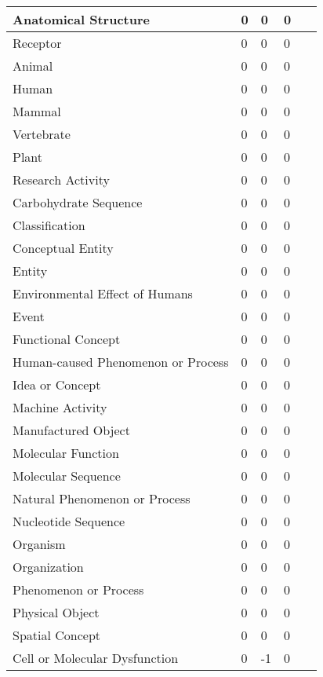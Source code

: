 \documentclass[10.7pt,]{article}
\begin{document}
\begin{longtable}{|l|p{0.3cm}|p{0.3cm}|p{0.3cm}|p{7.9cm}|}
        Anatomical Structure & 0 & 0 & 0 & ~ \\ \hline
        Receptor & 0 & 0 & 0 & ~ \\ \hline
        Animal & 0 & 0 & 0 & ~ \\ \hline
        Human & 0 & 0 & 0 & ~ \\ \hline
        Mammal & 0 & 0 & 0 & ~ \\ \hline
        Vertebrate & 0 & 0 & 0 & ~ \\ \hline
        Plant & 0 & 0 & 0 & ~ \\ \hline
        Research Activity & 0 & 0 & 0 & ~ \\ \hline
        Carbohydrate Sequence & 0 & 0 & 0 & ~ \\ \hline
        Classification & 0 & 0 & 0 & ~ \\ \hline
        Conceptual Entity & 0 & 0 & 0 & ~ \\ \hline
        Entity & 0 & 0 & 0 & ~ \\ \hline
        Environmental Effect of Humans & 0 & 0 & 0 & ~ \\ \hline
        Event & 0 & 0 & 0 & ~ \\ \hline
        Functional Concept & 0 & 0 & 0 & ~ \\ \hline
        Human-caused Phenomenon or Process & 0 & 0 & 0 & ~ \\ \hline
        Idea or Concept & 0 & 0 & 0 & ~ \\ \hline
        Machine Activity & 0 & 0 & 0 & ~ \\ \hline
        Manufactured Object & 0 & 0 & 0 & ~ \\ \hline
        Molecular Function & 0 & 0 & 0 & ~ \\ \hline
        Molecular Sequence & 0 & 0 & 0 & ~ \\ \hline
        Natural Phenomenon or Process & 0 & 0 & 0 & ~ \\ \hline
        Nucleotide Sequence & 0 & 0 & 0 & ~ \\ \hline
        Organism & 0 & 0 & 0 & ~ \\ \hline
        Organization & 0 & 0 & 0 & ~ \\ \hline
        Phenomenon or Process & 0 & 0 & 0 & ~ \\ \hline
        Physical Object & 0 & 0 & 0 & ~ \\ \hline
        Spatial Concept & 0 & 0 & 0 & ~ \\ \hline
        Cell or Molecular Dysfunction & 0 & -1 & 0 & ~ \\ \hline

\end{longtable}
\end{document}
